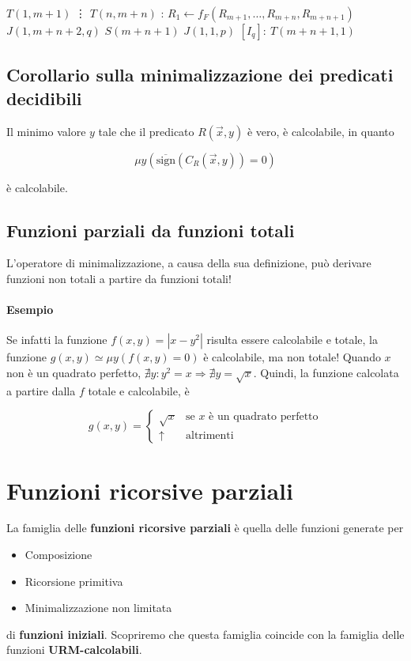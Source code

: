	\begin{algorithm}
		\caption{\textit{Minimalizzazione}}
		\begin{algorithmic}
			\State $T(1, m+1)$
			\State \qquad\vdots
			\State $T(n, m+n)$
			\State [$I_p$]:
			\State $R_1 \leftarrow f_F(R_{m+1}, \dots, R_{m+n}, R_{m+n+1})$
			\State $J(1, m+n+2, q)$
			\State $S(m+n+1)$
			\State $J(1,1,p)$
			\State $[I_q]: \ T(m+n+1, 1)$
		\end{algorithmic}
	\end{algorithm}
	
	
	\subsection{Corollario sulla minimalizzazione dei predicati decidibili}
	Il minimo valore $y$ tale che il predicato $R(\vec{x}, y)$ è vero, è calcolabile, in quanto
	
	$$
	\mu y (\overline{\mathrm{sign}}(C_R(\vec{x}, y) ) = 0)
	$$
	
	è calcolabile.
	
	\subsection{Funzioni parziali da funzioni totali}
	L'operatore di minimalizzazione, a causa della sua definizione, può derivare funzioni non totali a partire da funzioni totali! 
	
	\paragraph{Esempio} Se infatti la funzione $f(x,y) = |x - y^2|$ risulta essere calcolabile e totale, la funzione $g(x,y) \simeq \mu y(f(x,y) = 0)$ è calcolabile, ma non totale! Quando $x$ non è un quadrato perfetto, $\nexists y : y^2 = x \Rightarrow \nexists y = \sqrt{x}$. Quindi, la funzione calcolata a partire dalla $f$ totale e calcolabile, è
	
	$$
	g(x,y) = \begin{cases}
	\sqrt{x} & \text{se $x$ è un quadrato perfetto}\\
	\uparrow & \text{altrimenti}
	\end{cases}
	$$ 
	
	\section{Funzioni ricorsive parziali}
	
	La famiglia delle \textbf{funzioni ricorsive parziali} è quella delle funzioni generate per
	
	\begin{itemize}
		\item Composizione
		\item Ricorsione primitiva
		\item Minimalizzazione non limitata
	\end{itemize}
	
	di \textbf{funzioni iniziali}. Scopriremo che questa famiglia coincide con la famiglia delle funzioni \textbf{URM-calcolabili}.
	